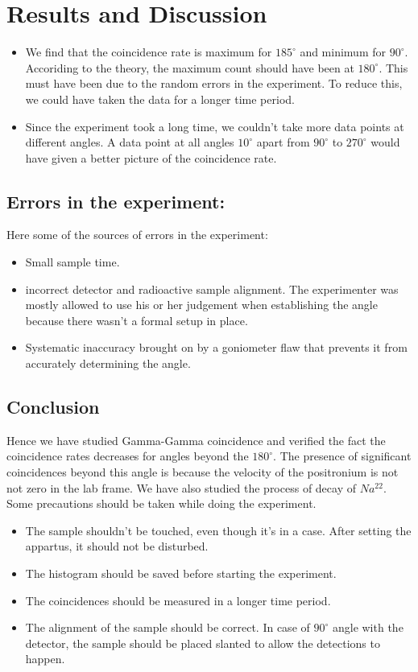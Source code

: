 \section{Results and Discussion}
	\begin{itemize}
		\item We find that the coincidence rate is maximum for $185^\circ$ and minimum for $90^\circ$. Accoriding to the theory, the maximum count should have been at $180^\circ$. This must have been due to the random errors in the experiment. To reduce this, we could have taken the data for a longer time period.
		\item Since the experiment took a long time, we couldn't take more data points at different angles. A data point at all angles  $10^\circ$ apart from $90^\circ$ to $270^\circ$ would have given a better picture of the coincidence rate.
	\end{itemize}
	\subsection{Errors in the experiment:}
	Here some of the sources of errors in the experiment:
	\begin{itemize}
		\item Small sample time.
		\item incorrect detector and radioactive sample alignment. The experimenter was mostly allowed to use his or her judgement when establishing the angle because there wasn't a formal setup in place.
		\item Systematic inaccuracy brought on by a goniometer flaw that prevents it from accurately determining the angle.
	\end{itemize}
	\subsection{Conclusion}
		Hence we have studied Gamma-Gamma coincidence and verified the fact the coincidence rates decreases for angles beyond the $180^\circ$. The presence of significant coincidences beyond this angle is because the velocity of the positronium is not not zero in the lab frame. We have also studied the process of decay of $Na^22$. Some precautions should be taken while doing the experiment.
		\begin{itemize}
			\item The sample shouldn't be touched, even though it's in a case. After setting the appartus, it should not be disturbed.
			\item The histogram should be saved before starting the experiment.
			\item The coincidences should be measured in a longer time period.
			\item The alignment of the sample should be correct. In case of $90^\circ$ angle with the detector, the sample should be placed slanted to allow the detections to happen.
		\end{itemize}